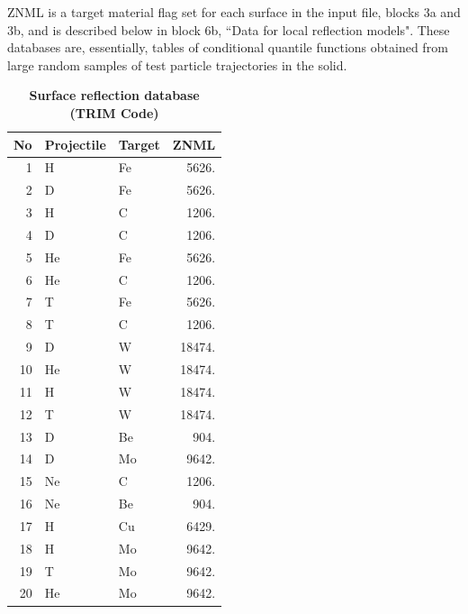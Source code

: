 ZNML is a target material flag set for each surface
in the input file, blocks 3a and 3b, and is described below in
block 6b, ``Data for local reflection models". These databases
are, essentially, tables of conditional quantile functions
obtained from large random samples of test particle trajectories
in the solid.
\begin{table}[h]
\caption {\bf Surface reflection database (TRIM Code)}
\label{tabref}
\begin{center}
\begin{tabular} {|r|l|l|r|} \hline
 {\bf No} & {\bf Projectile} & {\bf Target}
 &  {\bf ZNML}
 \\ \hline \hline

1 & H & Fe & 5626.   \\ \hline

2 & D & Fe & 5626.    \\ \hline

3 & H & C  & 1206.    \\ \hline

4 & D & C  &   1206.    \\ \hline

5 & He &Fe &  5626.    \\ \hline

6 & He & C  &  1206.    \\ \hline

7 & T  & Fe & 5626.    \\ \hline

8 & T & C  &  1206.    \\ \hline

9 & D  & W  & 18474.    \\ \hline

10 & He & W  & 18474.    \\ \hline

11 & H  & W  & 18474.    \\ \hline

12 & T  & W  & 18474.    \\ \hline\hline

13 & D  & Be &  904.    \\ \hline

14 & D  & Mo & 9642.    \\ \hline

15 & Ne & C  & 1206.    \\ \hline

16 & Ne & Be & 904.    \\ \hline

17 & H  & Cu & 6429.    \\ \hline

18 & H  & Mo & 9642.   \\ \hline

19 & T  & Mo &  9642.   \\ \hline

20 & He & Mo &  9642.   \\ \hline
\end{tabular}
\end{center}
\end{table}

